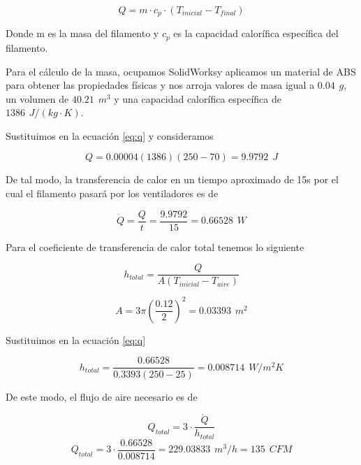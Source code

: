 \documentclass[14pt,oneside]{extarticle} %
\begin{document}
\begin{equation}
    Q=m\cdot c_p\cdot (T_{inicial}-T_{final})\label{eq:q}
\end{equation}

Donde m es la masa del filamento y $c_p$ es la capacidad calorífica específica del filamento.

Para el cálculo de la masa, ocupamos SolidWorks\textregistered y aplicamos un material de ABS para obtener las propiedades físicas y nos arroja valores de masa igual a $0.04\hspace{5pt}g$, un volumen de $40.21\hspace{5pt}m^3$ y una capacidad calorífica específica de $1386\hspace{5pt}J/(kg\cdot K)$.

Sustituimos en la ecuación \eqref{eq:q} y consideramos

\begin{equation*}
    Q=0.00004(1386)(250-70)=9.9792\hspace{5pt}J
\end{equation*}

De tal modo, la transferencia de calor en un tiempo aproximado de 15s por el cual el filamento pasará por los ventiladores es de

\begin{equation*}
    \dot{Q}=\frac{Q}{t}=\frac{9.9792}{15}=0.66528\hspace{5pt}W
\end{equation*}

Para el coeficiente de transferencia de calor total tenemos lo siguiente

\begin{equation}
    h_{total}=\frac{Q}{A(T_{inicial}-T_{aire})}\label{eq:q}
\end{equation}

\begin{equation*}
    A=3\pi\left(\frac{0.12}{2}\right)^2=0.03393\hspace{5pt}m^2
\end{equation*}

Sustituimos en la ecuación \eqref{eq:q}

\begin{equation*}
    h_{total}=\frac{0.66528}{0.3393(250-25)}=0.008714\hspace{5pt}W/m^2K
\end{equation*}

De este modo, el flujo de aire necesario es de

\begin{equation}
    Q_{total}=3\cdot\frac{\dot{Q}}{h_{total}}
\end{equation}
\begin{equation*}
    Q_{total}=3\cdot\frac{0.66528}{0.008714}=229.03833\hspace{5pt}m^3/h=135\hspace{5pt}CFM
\end{equation*}
\end{document}

